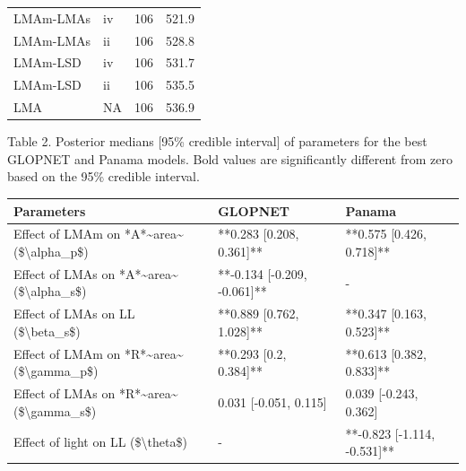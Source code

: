 \documentclass[
  12pt,
  letterpaper,
  DIV=11,
  numbers=noendperiod]{scrartcl}
\begin{document}
\begin{table}
\begin{tabular}{llrr}
\hspace{1em}LMAm-LMAs & iv & 106 & 521.9\\
\hspace{1em}LMAm-LMAs & ii & 106 & 528.8\\
\hspace{1em}LMAm-LSD & iv & 106 & 531.7\\
\hspace{1em}LMAm-LSD & ii & 106 & 535.5\\
\hspace{1em}LMA & NA & 106 & 536.9\\
\bottomrule
\end{tabular}
\end{table}

\newpage

Table 2. Posterior medians {[}95\% credible interval{]} of parameters
for the best GLOPNET and Panama models. Bold values are significantly
different from zero based on the 95\% credible interval.

\begin{longtable*}[t]{lll}
\toprule
Parameters & GLOPNET & Panama\\
\midrule
Effect of LMAm on *A*\textasciitilde{}area\textasciitilde{} (\$\textbackslash{}alpha\_p\$) & **0.283 [0.208, 0.361]** & **0.575 [0.426, 0.718]**\\
Effect of LMAs on *A*\textasciitilde{}area\textasciitilde{} (\$\textbackslash{}alpha\_s\$) & **-0.134 [-0.209, -0.061]** & -\\
Effect of LMAs on LL (\$\textbackslash{}beta\_s\$) & **0.889 [0.762, 1.028]** & **0.347 [0.163, 0.523]**\\
Effect of LMAm on *R*\textasciitilde{}area\textasciitilde{} (\$\textbackslash{}gamma\_p\$) & **0.293 [0.2, 0.384]** & **0.613 [0.382, 0.833]**\\
Effect of LMAs on *R*\textasciitilde{}area\textasciitilde{} (\$\textbackslash{}gamma\_s\$) & 0.031 [-0.051, 0.115] & 0.039 [-0.243, 0.362]\\
\addlinespace
Effect of light on LL (\$\textbackslash{}theta\$) & - & **-0.823 [-1.114, -0.531]**\\
\bottomrule
\end{longtable*}

\newpage
\end{document}
